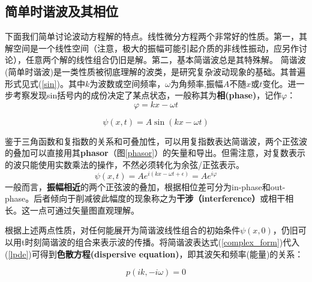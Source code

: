 \documentclass[12pt]{ctexart}%
\begin{document}
\subsection*{简单时谐波及其相位}
下面我们简单讨论波动方程解的特点。线性微分方程两个非常好的性质。第一，其解空间是一个线性空间（注意，极大的振幅可能引起介质的非线性振动，应另作讨论），任意两个解的线性组合仍旧是解。第二，基本简谐波总是其特殊解。
简谐波(简单时谐波)是一类性质被彻底理解的波类，是研究复杂波动现象的基础。其普遍形式见式(\ref{sin})。其中$k$为波数或空间频率，$\omega$为角频率,振幅$A$不随$x$或$t$变化。进一步考察发现sin括号内的成份决定了某点状态，一般称其为\textbf{相(phase)}，记作$\varphi$：
\begin{equation}
    \varphi=kx-\omega t
\end{equation}

\begin{framed}
\begin{equation}
    \psi(x,t)=A\sin(kx-\omega t)
    \label{sin}
\end{equation}
\end{framed}
鉴于三角函数和复指数的关系和可叠加性，可以用复指数表达简谐波，两个正弦波的叠加可以直接用其\textbf{phasor}（图\ref{phasor}）的矢量和导出。但需注意，对复数表示的波只能使用实数乘法的操作，不然必须转化为余弦/正弦表示。
\begin{equation}
    \psi(x,t)=Ae^{i(kx-\omega t+\epsilon)}=Ae^{i\varphi}
    \label{complex_form}
\end{equation}
一般而言，\textbf{振幅相近}的两个正弦波的叠加，根据相位差可分为in-phase和out-phase。后者倾向于削减彼此幅度的现象称之为\textbf{干涉（interference）}或相干相长。这一点可通过矢量图直观理解。
\par 根据上述两点性质，对任何能展开为简谐波线性组合的初始条件$\psi(x,0)$，仍旧可以用t时刻简谐波的组合来表示波的传播。将简谐波表达式(\ref{complex_form})代入(\ref{lpde})可得到\textbf{色散方程(dispersive equation)}，即其波矢和频率(能量)的关系：
\begin{framed}
    \begin{equation}
        p(ik,-i\omega)=0
        \label{dispersive_equation}
    \end{equation}
\end{framed}
\end{document}

